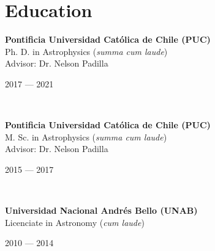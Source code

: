 \documentclass[12pt, a4paper]{article} %
\begin{document}
\section*{Education}


\begin{minipage}[t]{0.6\textwidth}
\begin{flushleft}%
  \setlength{\leftskip}{0.2cm}%
\textbf{Pontificia Universidad Cat\'olica de Chile (PUC)}\\
Ph. D. in Astrophysics (\textit{summa cum laude})\\
Advisor: Dr. Nelson Padilla
 
\end{flushleft}
\end{minipage}
\begin{minipage}[t]{0.4\textwidth}
\hfill 2017 --- 2021
\end{minipage}\\


\begin{minipage}[t]{0.6\textwidth}
\begin{flushleft}%
  \setlength{\leftskip}{0.2cm}%
\textbf{Pontificia Universidad Cat\'olica de Chile (PUC)}\\
M. Sc. in Astrophysics (\textit{summa cum laude})\\
Advisor: Dr. Nelson Padilla
 
\end{flushleft}
\end{minipage}
\begin{minipage}[t]{0.4\textwidth}
\hfill 2015 --- 2017 
\end{minipage}\\


\begin{minipage}[t]{0.6\textwidth}
\begin{flushleft}%
  \setlength{\leftskip}{0.2cm}%
    \textbf{Universidad Nacional Andr\'es Bello (UNAB)}\\
 Licenciate in Astronomy (\textit{cum laude})\\
 \end{flushleft}
\end{minipage}
\begin{minipage}[t]{0.4\textwidth}
\hfill 2010 --- 2014
\end{minipage}
\end{document}

